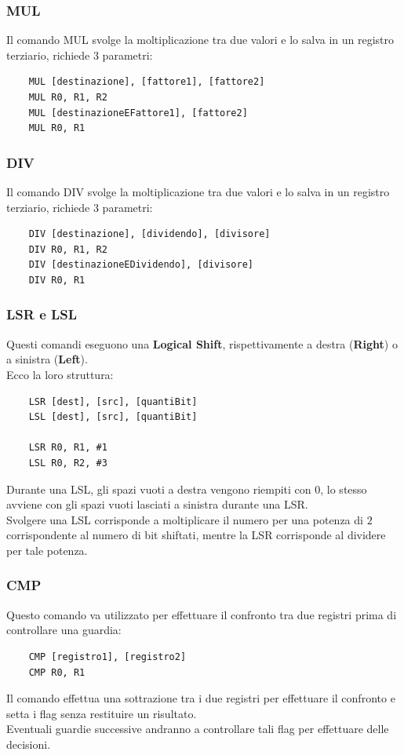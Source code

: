 \documentclass[12pt,a4paper]{article}
\begin{document}
\subsubsection{MUL}
Il comando MUL svolge la moltiplicazione tra due valori e lo salva in un registro terziario, richiede $3$ parametri:
\begin{lstlisting}
    MUL [destinazione], [fattore1], [fattore2]
    MUL R0, R1, R2
    MUL [destinazioneEFattore1], [fattore2]
    MUL R0, R1    
\end{lstlisting}
\subsubsection{DIV}
Il comando DIV svolge la moltiplicazione tra due valori e lo salva in un registro terziario, richiede $3$ parametri:
\begin{lstlisting}
    DIV [destinazione], [dividendo], [divisore]
    DIV R0, R1, R2
    DIV [destinazioneEDividendo], [divisore]
    DIV R0, R1    
\end{lstlisting}
\subsubsection{LSR e LSL}
Questi comandi eseguono una \textbf{Logical Shift}, rispettivamente a destra (\textbf{Right}) o a sinistra (\textbf{Left}).\\
Ecco la loro struttura:
\begin{lstlisting}
    LSR [dest], [src], [quantiBit]
    LSL [dest], [src], [quantiBit]

    LSR R0, R1, #1
    LSL R0, R2, #3
\end{lstlisting}
Durante una LSL, gli spazi vuoti a destra vengono riempiti con $0$, lo stesso avviene con gli spazi vuoti lasciati a sinistra durante una LSR.\\
Svolgere una LSL corrisponde a moltiplicare il numero per una potenza di $2$ corrispondente al numero di bit shiftati, mentre la LSR corrisponde al dividere per tale potenza.
\subsubsection{CMP}
Questo comando va utilizzato per effettuare il confronto tra due registri prima di controllare una guardia:
\begin{lstlisting}
    CMP [registro1], [registro2]
    CMP R0, R1
\end{lstlisting}
Il comando effettua una sottrazione tra i due registri per effettuare il confronto e setta i flag senza restituire un risultato.\\
Eventuali guardie successive andranno a controllare tali flag per effettuare delle decisioni.
\end{document}
